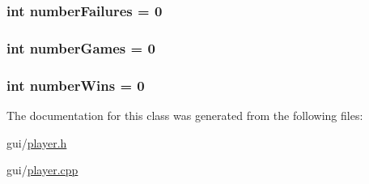 \subsubsection[{\texorpdfstring{number\+Failures}{numberFailures}}]{\setlength{\rightskip}{0pt plus 5cm}int number\+Failures = 0\hspace{0.3cm}{\ttfamily [private]}}\hypertarget{classPlayer_aeee09fe6d2b453144787ac2b70052d69}{}\label{classPlayer_aeee09fe6d2b453144787ac2b70052d69}
\subsubsection[{\texorpdfstring{number\+Games}{numberGames}}]{\setlength{\rightskip}{0pt plus 5cm}int number\+Games = 0\hspace{0.3cm}{\ttfamily [private]}}\hypertarget{classPlayer_a1d6d057cd152c5d158546791cbd6bc8f}{}\label{classPlayer_a1d6d057cd152c5d158546791cbd6bc8f}
\subsubsection[{\texorpdfstring{number\+Wins}{numberWins}}]{\setlength{\rightskip}{0pt plus 5cm}int number\+Wins = 0\hspace{0.3cm}{\ttfamily [private]}}\hypertarget{classPlayer_a5490bb5e66c3e5ac702c7df4f363d57d}{}\label{classPlayer_a5490bb5e66c3e5ac702c7df4f363d57d}


The documentation for this class was generated from the following files\+:\begin{DoxyCompactItemize}
\item 
gui/\hyperlink{gui_2player_8h}{player.\+h}\item 
gui/\hyperlink{gui_2player_8cpp}{player.\+cpp}\end{DoxyCompactItemize}
